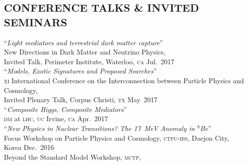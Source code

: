 \documentclass[margin,line]{resume}
\newcommand{\mytalksep}{-.1mm}
\newcommand{\mytalkskip}{2mm}
\newcommand{\scap}[1]{\textsc{\MakeLowercase{#1}}}
\begin{document}
\begin{resume}
\vspace{-2mm}


\section{\footnotesize \sc
\sffamily 
{}
CONFERENCE 
TALKS \&
INVITED SEMINARS
}

``\emph{Light mediators and terrestrial dark matter capture}'' 
\vspace{\mytalksep}\\ 
New Directions in Dark Matter and Neutrino Physics,\\
	Invited Talk, Perimeter Institute, Waterloo, \scap{CA}
\hfill %
Jul.~2017\vspace{\mytalkskip}\\   
%
%
%
``\emph{Models, Exotic Signatures and Proposed Searches}'' 
\vspace{\mytalksep}\\ 
\scap{XI} International Conference on the Interconnection between Particle Physics and Cosmology,\\
	Invited Plenary Talk, Corpus Christi, \scap{TX}
\hfill %
May~2017\vspace{\mytalkskip}\\   
%
%
%
``\emph{Composite Higgs, Composite Mediators}''
\vspace{\mytalksep}\\ 
\scap{DM} at \scap{LHC}, \scap{UC} Irvine, \scap{CA}
\hfill %
Apr.~2017\vspace{\mytalkskip}\\   
%
%
%
``\emph{New Physics in Nuclear Transitions? The 17~MeV Anomaly in $^8$Be}''
\vspace{\mytalksep}\\ 
%
Focus Workshop on Particle Physics and Cosmology,
\scap{CTPU-IBS},
Daejon City, Korea
\hfill %
Dec.~2016\vspace{\mytalksep}\\ 
%
Beyond the Standard Model Workshop,
\scap{MCTP},

\end{resume}
\end{document}
